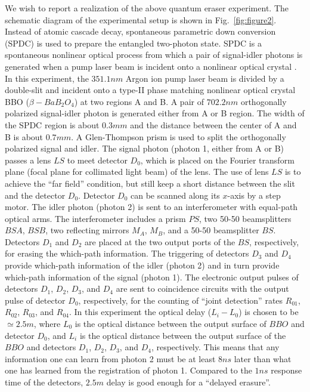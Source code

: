\documentclass[pra,aps,epsf,12pt]{revtex4-2}
\begin{document}
We wish to report a realization of the above quantum eraser experiment. The schematic
diagram of the experimental setup is shown in Fig.~\ref{fig:figure2}. Instead of atomic
cascade decay, spontaneous parametric down conversion (SPDC) is used to prepare the
entangled two-photon state. SPDC is a spontaneous nonlinear optical process from which a
pair of signal-idler photons is generated when a pump laser beam is incident onto a
nonlinear optical crystal \cite{SPDC}. In this experiment, the $351.1nm$ Argon ion pump
laser beam is divided by a double-slit and incident onto a type-II phase matching
\cite{typeII} nonlinear optical crystal BBO ($\beta-BaB_{2}O_{4}$) at two regions A and
B. A pair of $702.2nm$ orthogonally polarized signal-idler photon is generated either
from A or B region. The width of the SPDC region is about $0.3mm$ and the distance
between the center of A and B is about $0.7mm$. A Glen-Thompson prism is used to split
the orthogonally polarized signal and idler. The signal photon (photon 1, either from A
or B) passes a lens $LS$ to meet detector $D_{0}$, which is placed on the Fourier
transform plane (focal plane for collimated light beam) of the lens. The use of lens $LS$
is to achieve the ``far field'' condition, but still keep a short distance between the
slit and the detector $D_{0}$. Detector $D_{0}$ can be scanned along its $x$-axis by a
step motor. The idler photon (photon 2) is sent to an interferometer with equal-path
optical arms. The interferometer includes a prism $PS$, two 50-50 beamsplitters $BSA$,
$BSB$, two reflecting mirrors $M_{A}$, $M_{B}$, and a 50-50 beamsplitter $BS$. Detectors
$D_{1}$ and $D_{2}$ are placed at the two output ports of the $BS$, respectively, for
erasing the which-path information. The triggering of detectors $D_{3}$ and $D_{4}$
provide which-path information of the idler (photon 2) and in turn provide which-path
information of the signal (photon 1). The electronic output pulses of detectors $D_{1}$,
$D_{2}$, $D_{3}$, and $D_{4}$ are sent to coincidence circuits with the output pulse of
detector $D_{0}$,
respectively, for the counting of ``joint detection'' rates $R_{01}$, $%
R_{02} $, $R_{03}$, and $R_{04}$. In this experiment the optical delay ($%
L_{i}-L_{0} $) is chosen to be $\simeq 2.5m$, where $L_{0}$ is the
optical
distance between the output surface of $BBO$ and detector $D_{0}$, and $%
L_{i} $ is the optical distance between the output surface of the $BBO$ and detectors
$D_{1} $, $D_{2}$, $D_{3}$, and $D_{4}$, respectively. This means that any information
one can learn from photon 2 must be at least $8ns$ later
than what one has learned from the registration of photon 1. Compared to the $%
1ns$ response time of the detectors, $2.5m$ delay is good enough
for a ``delayed erasure''.
\end{document}
